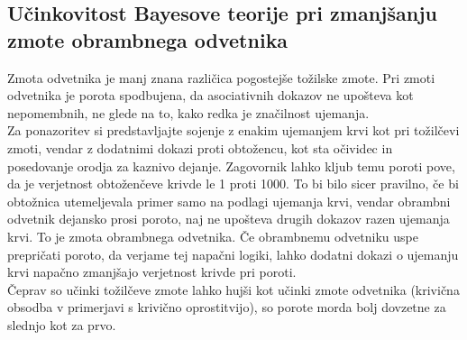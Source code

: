 \documentclass[mat1, tisk]{fmfdelo}
\theoremstyle{definition} %
\theoremstyle{trditev} %
\theoremstyle{izrek}
\begin{document}
\subsection{Učinkovitost Bayesove teorije pri zmanjšanju zmote obrambnega odvetnika}
Zmota odvetnika je manj znana različica pogostejše tožilske zmote. Pri zmoti odvetnika je porota spodbujena, da asociativnih dokazov ne upošteva 
kot nepomembnih, ne glede na to, kako redka je značilnost ujemanja.\\
Za ponazoritev si predstavljajte sojenje z enakim ujemanjem krvi kot pri tožilčevi zmoti, vendar z dodatnimi dokazi proti obtožencu, kot sta 
očividec in posedovanje orodja za kaznivo dejanje. Zagovornik lahko kljub temu poroti pove, da je verjetnost obtoženčeve krivde le 1 proti 1000. 
To bi bilo sicer pravilno, če bi obtožnica utemeljevala primer samo na podlagi ujemanja krvi, vendar obrambni odvetnik dejansko prosi poroto, 
naj ne upošteva drugih dokazov razen ujemanja krvi. To je zmota obrambnega odvetnika. Če obrambnemu odvetniku uspe prepričati poroto, da verjame 
tej napačni logiki, lahko dodatni dokazi o ujemanju krvi napačno zmanjšajo verjetnost krivde pri poroti.\\
Čeprav so učinki tožilčeve zmote lahko hujši kot učinki zmote odvetnika (krivična obsodba v primerjavi s krivično oprostitvijo), so porote morda 
bolj dovzetne za slednjo kot za prvo. 

\end{document}
